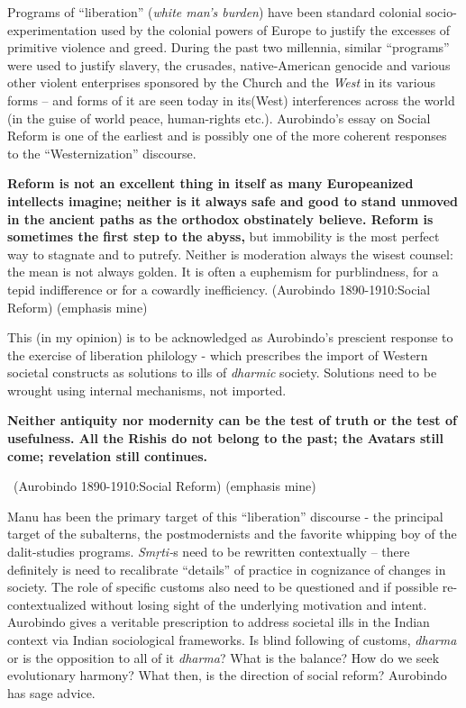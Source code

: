 Programs of “liberation” (\textit{white man's burden}) have been standard colonial socio-experimentation used by the colonial powers of Europe to justify the excesses of primitive violence and greed. During the past two millennia, similar “programs” were used to justify slavery, the crusades, native-American genocide and various other violent enterprises sponsored by the Church and the \textit{West} in its various forms – and forms of it are seen today in its(West) interferences across the world (in the guise of world peace, human-rights etc.). Aurobindo's essay on Social Reform is one of the earliest and is possibly one of the more coherent responses to the “Westernization” discourse.

\begin{myquote}
\textbf{Reform is not an excellent thing in itself as many Europeanized intellects imagine; neither is it always safe and good to stand unmoved in the ancient paths as the orthodox obstinately believe. Reform is sometimes the first step to the abyss,} but immobility is the most perfect way to stagnate and to putrefy. Neither is moderation always the wisest counsel: the mean is not always golden. It is often a euphemism for purblindness, for a tepid indifference or for a cowardly inefficiency. \hfill (Aurobindo 1890-1910:Social Reform) (emphasis mine)
\end{myquote}

This (in my opinion) is to be acknowledged as Aurobindo's prescient response to the exercise of liberation philology - which prescribes the import of Western societal constructs as solutions to ills of \textit{dharmic} society. Solutions need to be wrought using internal mechanisms, not imported.

\begin{myquote}
\textbf{Neither antiquity nor modernity can be the test of truth or the test of usefulness. All the Rishis do not belong to the past; the Avatars still come; revelation still continues.} 

~\hfill (Aurobindo 1890-1910:Social Reform) (emphasis mine)
\end{myquote}

Manu has been the primary target of this “liberation” discourse - the principal target of the subalterns, the postmodernists and the favorite whipping boy of the dalit-studies programs. \textit{Smṛti-}s need to be rewritten contextually – there definitely is need to recalibrate “details” of practice in cognizance of changes in society. The role of specific customs also need to be questioned and if possible re-contextualized without losing sight of the underlying motivation and intent. Aurobindo gives a veritable prescription to address societal ills in the Indian context via Indian sociological frameworks. Is blind following of customs, \textit{dharma} or is the opposition to all of it \textit{dharma}? What is the balance? How do we seek evolutionary harmony? What then, is the direction of social reform? Aurobindo has sage advice.


